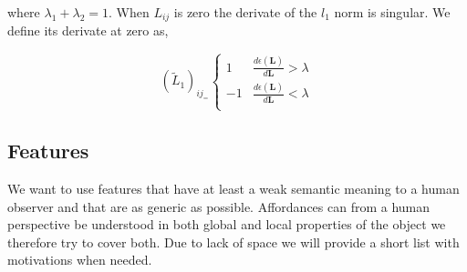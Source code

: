 \normalsize

where \(\lambda_1 + \lambda_2 = 1\). When \(L_{ij}\) is zero the
derivate of the \(l_1\) norm is singular. We define its derivate at zero
as,

\begin{equation}
 ( \tilde{L}_1 )_{ij}_ =
  \begin{cases}
    1   & \frac{d\epsilon(\mathbf{L})}{d\mathbf{L}} > \lambda \\
    -1  & \frac{d\epsilon(\mathbf{L})}{d\mathbf{L}} < \lambda \\
  \end{cases}
\end{equation}

\begin{comment}
[We should maybe investigate if the penalization has the same effect on the eigenvalues as ridge regression ]
\end{comment}

\subsection{Features}\label{features}

We want to use features that have at least a weak semantic meaning to a
human observer and that are as generic as possible. Affordances can from
a human perspective be understood in both global and local properties of
the object we therefore try to cover both. Due to lack of space we will
provide a short list with motivations when needed.

\small

